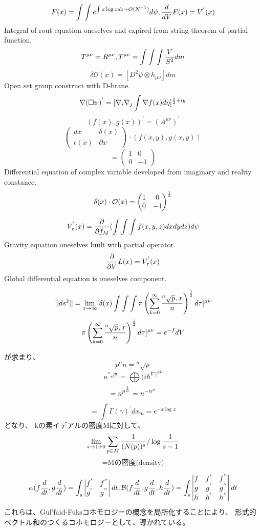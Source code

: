 \documentclass{jsarticle}
\begin{document}
{  $$ F(x) = \int \int e^{\int x \log x dx + O(N^{-1})}d \psi, {d \over dV}F(x) = V^{'}(x) $$
  Integral of rout equation oneselves and expired from string theorem of partial function.
  $$ T^{\mu\nu} = R^{\mu\nu}, T^{\mu\nu} = \int \int \int {V \over S^2}dm $$
  $$ \delta \mathcal{O}(x) =
  [D^2 \psi \otimes h_{\mu\nu}]dm$$ 
  Open set group construct with D-brane.
  $$ \nabla(\square \psi)^{'} = [\nabla_{i}\nabla_{j} \int \nabla f(x) d \eta]
  ^{{1 \over 2}+ iy} $$
  $$ \left(f(x), g(x) \right)^{'} = (A^{\mu\nu})^{'} $$
  $$ \begin{pmatrix} dx & \delta(x) \\
  \epsilon(x) & \partial x \end{pmatrix} \cdot \left(f(x,y), g(x,y)\right) $$
  $$ = \begin{pmatrix} 1 & 0 \\
  0 & - 1 \end{pmatrix} $$
  Differential equation of complex variable developed from imaginary and reality constance.
  $$ \delta(x) \cdot \mathcal{O}(x) = \begin{pmatrix} 1 & 0 \\
  0 & - 1 \end{pmatrix}^{1 \over 2} $$

  $$ V^{'}_{\tau}(x) = {\partial \over \partial f_M}(\int \int \int f(x,y,z)dxdydz)d \psi $$
  Gravity equation oneselves built with partial operator.
  $$ {\partial \over \partial V}L(x) = V^{'}_{\tau}(x) $$
  Global differential equation is oneselves component.








	
$$ ||ds^2|| = \lim_{x \to \infty} [\delta(x) \int \int \int \pi \left( \sum_{k=0}^{\infty}
		{{}^n\sqrt{p},x \over n} \right)
^{1 \over 2}d \tau]^{\mu\nu} $$
$$ \pi \left( \sum_{k=0}^{\infty}
		{{}^n\sqrt{p},x \over n} \right)
^{1 \over 2}d \tau]^{\mu\nu} = e^{-f}dV $$

     が求まり、
     $$ p^{\alpha} n = {}^n \sqrt{p} $$
     $$ n^{{}^n\sqrt{p}} = \bigoplus{(i \hbar^{{{\nabla)}}^{\oplus 
     L}}} $$
     $$ = n^{p^{{1 \over n}}} = n^{{-n}^{p}}  $$
     $$ = \int \Gamma(\gamma)^{'}dx_m = e^{-x \log x} $$
     となり、
     kの素イデアルの密度Mに対して、
     $$ \lim_{s \to {1 + 0}} \sum_{{p \in M}} {
	     1 \over (N(p))^{s}}/ \log {1 \over 
     {s - 1} } $$
     $$ = \text{Mの密度(density)} $$

     $$ \alpha(f{d \over dt},g{d \over dt}) = \int_s \begin{vmatrix}
	     f^{'} & f^{''} \\
	     g^{'} & g^{''} \end{vmatrix}dt,
	     \mathcal{B}(f{d \over dt},g{d \over dt},h{d \over dt}) =
	     \int_s \begin{vmatrix} f & f^{'} & f^{''} \\
		     g & g^{'} & g^{''} \\
	     h & h^{'} & h^{''} \end{vmatrix}dt $$
    これらは、Gul'faid-Fuksコホモロジーの概念を局所化することにより、
    形式的ベクトル和のつくるコホモロジーとして、導かれている。


}
\end{document}
